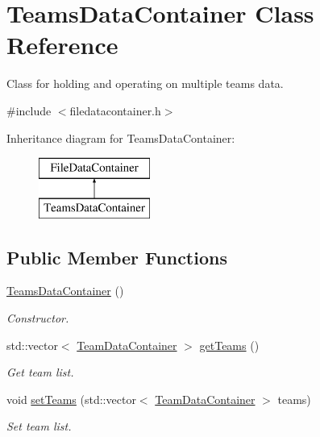 \hypertarget{classTeamsDataContainer}{}\section{Teams\+Data\+Container Class Reference}
\label{classTeamsDataContainer}


Class for holding and operating on multiple teams data.  




{\ttfamily \#include $<$filedatacontainer.\+h$>$}

Inheritance diagram for Teams\+Data\+Container\+:\begin{figure}[H]
\begin{center}
\leavevmode
\includegraphics[height=2.000000cm]{classTeamsDataContainer}
\end{center}
\end{figure}
\subsection*{Public Member Functions}
\begin{DoxyCompactItemize}
\item 
\mbox{\hyperlink{classTeamsDataContainer_a1f89b90ca2fe5f13b7940959afb20096}{Teams\+Data\+Container}} ()
\begin{DoxyCompactList}\small\item\em Constructor. \end{DoxyCompactList}\item 
std\+::vector$<$ \mbox{\hyperlink{classTeamDataContainer}{Team\+Data\+Container}} $>$ \mbox{\hyperlink{classTeamsDataContainer_afddf02ba3f5c1cbb45aa855623ff3f35}{get\+Teams}} ()
\begin{DoxyCompactList}\small\item\em Get team list. \end{DoxyCompactList}\item 
void \mbox{\hyperlink{classTeamsDataContainer_ad548ee4d3ac8d05fdb4f99d159cb41cd}{set\+Teams}} (std\+::vector$<$ \mbox{\hyperlink{classTeamDataContainer}{Team\+Data\+Container}} $>$ teams)
\begin{DoxyCompactList}\small\item\em Set team list. \end{DoxyCompactList}\end{DoxyCompactItemize}



